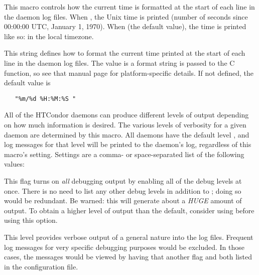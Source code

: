 \begin{description}
\label{param:LogsUseTimestamp}
\item[\Macro{LOGS\_USE\_TIMESTAMP}]
  This macro controls how the current time is formatted at the start of
  each line in the daemon log files. When , the Unix time is
  printed (number of seconds since 00:00:00 UTC, January 1, 1970).
  When  (the default value), the time is printed like so:
   in the local timezone.

\label{param:DebugTimeFormat}
\item[\Macro{DEBUG\_TIME\_FORMAT}]
  This string defines how to format the current time printed at the
  start of each line in the daemon log files.  The value is a format 
  string is passed to the C  function,
  so see that manual page for platform-specific details.
  If not defined, the default value is 
\begin{verbatim}
   "%m/%d %H:%M:%S "  
\end{verbatim}

\label{param:SubsysDebug}
\item[\MacroB{<SUBSYS>\_DEBUG}]
  All of the
  HTCondor daemons can produce different levels of output depending on
  how much information is desired.  The various levels of
  verbosity for a given daemon are determined by this macro.  All
  daemons have the default level , and log messages for
  that level will be printed to the daemon's log, regardless of this
  macro's setting.  Settings are a comma- or space-separated list
  of the following values:

  \begin{description}
    \label{list:debug-level-description}

  \label{dflag:all}
  \item[\Dflag{ALL}]
    This flag turns on \emph{all} debugging output by enabling all of the debug
    levels at once.  There is no need to list any other debug levels in addition
    to ; doing so would be redundant.  Be warned: this will
    generate
    about a \emph{HUGE} amount of output.
    To obtain a higher
    level of output than the default, consider using  before
    using this option.

  \label{dflag:fulldebug}
  \item[\Dflag{FULLDEBUG}]
    This level
    provides verbose output of a general nature into the log files.  
    Frequent log messages for very specific debugging
    purposes would be excluded. In those cases, the messages would
    be viewed by having that another flag and  both
    listed in the configuration file.


\end{description}
\end{description}
